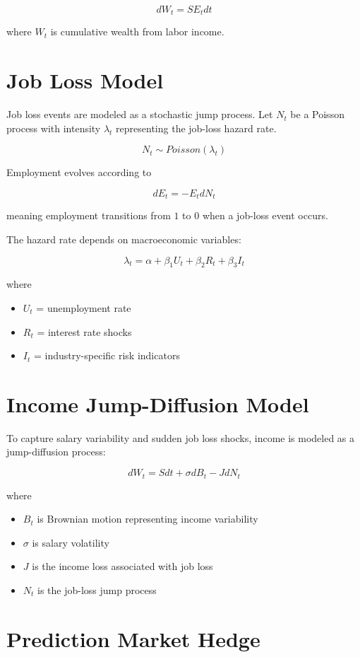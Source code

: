 \documentclass[11pt]{article}
\begin{document}
\[
dW_t = S E_t dt
\]

where $W_t$ is cumulative wealth from labor income.


\section{Job Loss Model}

Job loss events are modeled as a stochastic jump process. Let $N_t$ be a Poisson 
process with intensity $\lambda_t$ representing the job-loss hazard rate.

\[
N_t \sim Poisson(\lambda_t)
\]

Employment evolves according to

\[
dE_t = -E_t dN_t
\]

meaning employment transitions from $1$ to $0$ when a job-loss event occurs.

The hazard rate depends on macroeconomic variables:

\[
\lambda_t = \alpha + \beta_1 U_t + \beta_2 R_t + \beta_3 I_t
\]

where

\begin{itemize}
\item $U_t$ = unemployment rate
\item $R_t$ = interest rate shocks
\item $I_t$ = industry-specific risk indicators
\end{itemize}

\section{Income Jump-Diffusion Model}

To capture salary variability and sudden job loss shocks, income is modeled as a 
jump-diffusion process:

\[
dW_t = S dt + \sigma dB_t - J dN_t
\]

where

\begin{itemize}
\item $B_t$ is Brownian motion representing income variability
\item $\sigma$ is salary volatility
\item $J$ is the income loss associated with job loss
\item $N_t$ is the job-loss jump process
\end{itemize}

\section{Prediction Market Hedge}
\end{document}
